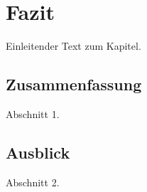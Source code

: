 \chapter{Fazit\label{chap5:Fünftes-Kapitel}}

Einleitender Text zum Kapitel.



\section{Zusammenfassung\label{sec5.1:Unterpunkt-1}}

Abschnitt 1.

\section{Ausblick\label{sec5.2:Unterpunkt-2}}

Abschnitt 2.